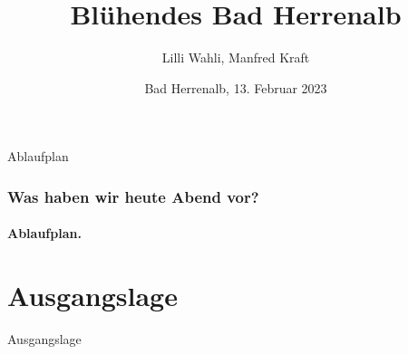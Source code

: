 \documentclass[aspectratio=169]{beamer}
\begin{document}

\author[Manfred]{Lilli Wahli, Manfred Kraft}
 
\title[Biodiversität]{\textbf{Blühendes Bad Herrenalb}}
\date{Bad Herrenalb, 13. Februar 2023}

\frame{\titlepage}



\begin{frame}{Ablaufplan}
\frametitle{{Was haben wir heute Abend vor?}}
\framesubtitle{Ablaufplan.} 


\tableofcontents[hideallsubsections]
\end{frame}                 


\section{Ausgangslage}

\begin{frame}{Ausgangslage}
\end{frame}

\end{document}
